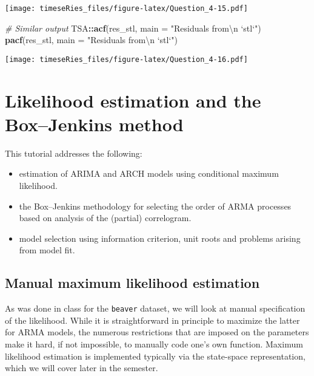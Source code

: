 \documentclass[]{book}
\newenvironment{Shaded}{\begin{snugshade}}{\end{snugshade}}
\newcommand{\CharTok}[1]{\textcolor[rgb]{0.31,0.60,0.02}{#1}}
\newcommand{\CommentTok}[1]{\textcolor[rgb]{0.56,0.35,0.01}{\textit{#1}}}
\newcommand{\DataTypeTok}[1]{\textcolor[rgb]{0.13,0.29,0.53}{#1}}
\newcommand{\KeywordTok}[1]{\textcolor[rgb]{0.13,0.29,0.53}{\textbf{#1}}}
\newcommand{\NormalTok}[1]{#1}
\newcommand{\OperatorTok}[1]{\textcolor[rgb]{0.81,0.36,0.00}{\textbf{#1}}}
\newcommand{\StringTok}[1]{\textcolor[rgb]{0.31,0.60,0.02}{#1}}
\providecommand{\tightlist}{%
  \setlength{\itemsep}{0pt}\setlength{\parskip}{0pt}}
\begin{document}
\texttt{[image: timeseRies\_files/figure-latex/Question\_4-15.pdf]}

\begin{Shaded}
\begin{Highlighting}[]
\CommentTok{# Similar output}
\NormalTok{TSA}\OperatorTok{::}\KeywordTok{acf}\NormalTok{(res_stl, }\DataTypeTok{main =} \StringTok{"Residuals from}\CharTok{\textbackslash{}n}\StringTok{ `stl`"}\NormalTok{)}
\KeywordTok{pacf}\NormalTok{(res_stl, }\DataTypeTok{main =} \StringTok{"Residuals from}\CharTok{\textbackslash{}n}\StringTok{ `stl`"}\NormalTok{)}
\end{Highlighting}
\end{Shaded}

\texttt{[image: timeseRies\_files/figure-latex/Question\_4-16.pdf]}

\hypertarget{likelihood-estimation-and-the-boxjenkins-method}{%
\chapter{Likelihood estimation and the Box--Jenkins
method}\label{likelihood-estimation-and-the-boxjenkins-method}}

This tutorial addresses the following:

\begin{itemize}
\tightlist
\item
  estimation of ARIMA and ARCH models using conditional maximum
  likelihood.
\item
  the Box--Jenkins methodology for selecting the order of ARMA processes
  based on analysis of the (partial) correlogram.
\item
  model selection using information criterion, unit roots and problems
  arising from model fit.
\end{itemize}

\hypertarget{manual-maximum-likelihood-estimation}{%
\section{Manual maximum likelihood
estimation}\label{manual-maximum-likelihood-estimation}}

As was done in class for the \texttt{beaver} dataset, we will look at
manual specification of the likelihood. While it is straightforward in
principle to maximize the latter for ARMA models, the numerous
restrictions that are imposed on the parameters make it hard, if not
impossible, to manually code one's own function. Maximum likelihood
estimation is implemented typically via the state-space representation,
which we will cover later in the semester.
\end{document}
